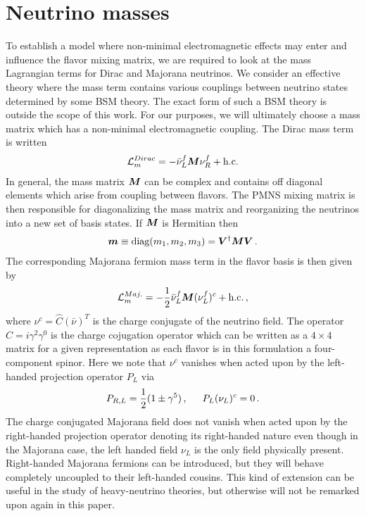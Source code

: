 \section{Neutrino masses}
\noindent To establish a model where non-minimal electromagnetic effects may enter and influence the flavor mixing matrix, we are required to look at the mass Lagrangian terms for Dirac and Majorana neutrinos. We consider an effective theory where the mass term contains various couplings between neutrino states determined by some BSM theory. The exact form of such a BSM theory is outside the scope of this work. For our purposes, we will ultimately choose a mass matrix which has a non-minimal electromagnetic coupling. The Dirac mass term is written
\begin{alignat}{1}
	\label{mass:eq:01} \mathcal{L}_{m}^{Dirac} = -\bar{\nu}^{f}_{L}\boldsymbol{M}\nu^{f}_{R}+\mathrm{h.c.}
\end{alignat}
In general, the mass matrix $\boldsymbol{M}$ can be complex and contains off diagonal elements which arise from coupling between flavors. The PMNS mixing matrix is then responsible for diagonalizing the mass matrix and reorganizing the neutrinos into a new set of basis states. If $\boldsymbol{M}$ is Hermitian then
\begin{alignat}{1}
	\label{mass:eq:02} \boldsymbol{m} \equiv \mathrm{diag}(m_{1}, m_{2}, m_{3}) = \boldsymbol{V}^{\dagger}\boldsymbol{M}\boldsymbol{V}\,.
\end{alignat}
The corresponding Majorana fermion mass term in the flavor basis is then given by
\begin{alignat}{1}
	\label{mass:eq:03} \mathcal{L}_{m}^{Maj.} = -\frac{1}{2}\bar{\nu}^{f}_{L}\boldsymbol{M}(\nu^{f}_{L})^{c}+\mathrm{h.c.}\,,
\end{alignat}
where $\nu^{c} = \hat{C}(\bar{\nu})^{T}$ is the charge conjugate of the neutrino field. The operator $\hat{C} = i\gamma^{2}\gamma^{0}$ is the charge cojugation operator which can be written as a $4\times4$ matrix for a given representation as each flavor is in this formulation a four-component spinor. Here we note that $\nu^{c}$ vanishes when acted upon by the left-handed projection operator $P_{L}$ via
\begin{alignat}{1}
	\label{mass:eq:04} P_{R,L} = \frac{1}{2}(1\pm\gamma^{5})\,,\indent P_{L}(\nu_{L})^{c}=0\,.
\end{alignat}
The charge conjugated Majorana field does not vanish when acted upon by the right-handed projection operator denoting its right-handed nature even though in the Majorana case, the left handed field $\nu_{L}$ is the only field physically present. Right-handed Majorana fermions can be introduced, but they will behave completely uncoupled to their left-handed cousins. This kind of extension can be useful in the study of heavy-neutrino theories, but otherwise will not be remarked upon again in this paper.


